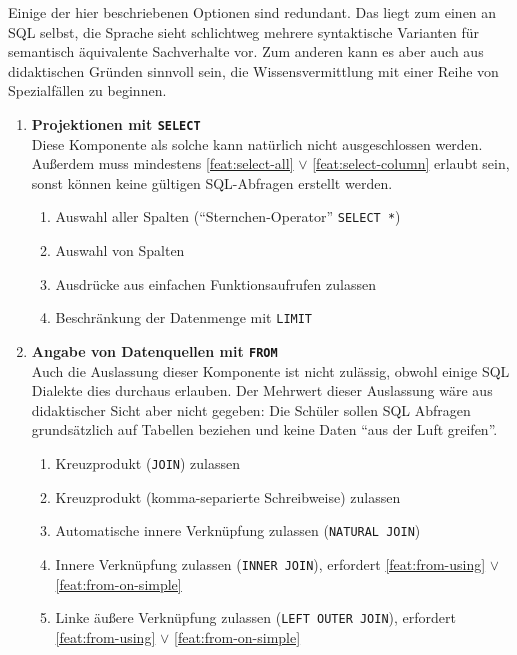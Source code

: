 Einige der hier beschriebenen Optionen sind redundant. Das liegt zum einen an SQL selbst, die Sprache sieht schlichtweg mehrere syntaktische Varianten für semantisch äquivalente Sachverhalte vor. Zum anderen kann es aber auch aus didaktischen Gründen sinnvoll sein, die Wissensvermittlung mit einer Reihe von Spezialfällen zu beginnen.

\begin{enumerate}
\item \textbf{Projektionen mit \texttt{SELECT}} \\
  Diese Komponente als solche kann natürlich nicht ausgeschlossen werden. Außerdem muss mindestens \ref{feat:select-all} $\lor$ \ref{feat:select-column} erlaubt sein, sonst können keine gültigen SQL-Abfragen erstellt werden.
  \begin{enumerate}
  \item \label{feat:select-all} Auswahl aller Spalten (``Sternchen-Operator'' \texttt{SELECT *})
  \item \label{feat:select-column} Auswahl von Spalten
  \item \label{feat:select-single-function} Ausdrücke aus einfachen Funktionsaufrufen zulassen
  \item \label{feat:select-limit} Beschränkung der Datenmenge mit \texttt{LIMIT}
  \end{enumerate}
\item \textbf{Angabe von Datenquellen mit \texttt{FROM}} \\
  Auch die Auslassung dieser Komponente ist nicht zulässig, obwohl einige SQL Dialekte dies durchaus erlauben. Der Mehrwert dieser Auslassung wäre aus didaktischer Sicht aber nicht gegeben: Die Schüler sollen SQL Abfragen grundsätzlich auf Tabellen beziehen und keine Daten ``aus der Luft greifen''.
  \begin{enumerate}
  \item \label{feat:from-cross-join} Kreuzprodukt (\texttt{JOIN}) zulassen
  \item \label{feat:from-cross-comma} Kreuzprodukt (komma-separierte Schreibweise) zulassen
  \item \label{feat:from-natural-join} Automatische innere Verknüpfung zulassen (\texttt{NATURAL JOIN})
  \item \label{feat:from-inner-join} Innere Verknüpfung zulassen (\texttt{INNER JOIN}), erfordert \ref{feat:from-using} $\lor$ \ref{feat:from-on-simple}
  \item \label{feat:from-left-join} Linke äußere Verknüpfung zulassen (\texttt{LEFT OUTER JOIN}), erfordert \ref{feat:from-using} $\lor$ \ref{feat:from-on-simple}

\end{enumerate}
\end{enumerate}
